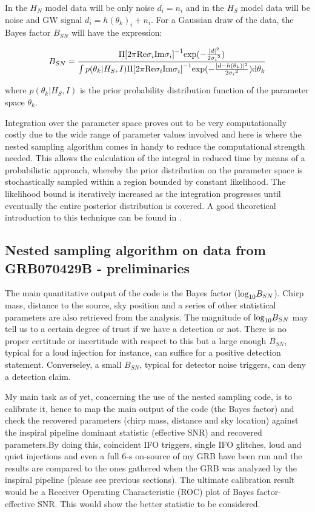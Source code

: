 \documentclass[epsf]{article}
\begin{document}
In the $H_N$ model data will be only noise $d_i=n_i$ and in the $H_S$ model data will be noise and GW signal $d_i=h(\theta_k)_i+n_i$. For a Gaussian draw of the data, the Bayes factor $B_{SN}$ will have the expression:

\begin{equation}
B_{SN} = \frac {\Pi {[2 \pi {\rm Re} \sigma_i {\rm Im} \sigma_i]}^{-1} {\rm exp}(-\frac{|d|^2}{2{\sigma_i}^2})}{\int p(\theta_k|H_S,I) \Pi {[2 \pi {\rm Re} \sigma_i {\rm Im} \sigma_i]}^{-1} {\rm exp}(-\frac {|d-h(\theta_k)|^2}{2{\sigma_i}^2}){\rm d} \theta_k}
\end{equation}

where $p(\theta_k|H_S,I)$ is the prior probability distribution function of the parameter space $\theta_k$. 

 Integration over the parameter space proves out to be very computationally costly \cite{veitch} due to the wide range of parameter values involved and here is where the nested sampling algorithm comes in handy to reduce the computational strength needed. This allows the calculation of the integral in reduced time by means of a probabilistic approach, whereby the prior distribution on the parameter space
is stochastically sampled within a region bounded by constant likelihood. The likelihood
bound is iteratively increased as the integration progresses until eventually the entire posterior
distribution is covered. A good theoretical introduction to this technique can be found in \cite{skilling}.

\subsection{Nested sampling algorithm on data from GRB070429B - preliminaries}

 The main quantitative output of the code is the Bayes factor (${\rm log}_{10}B_{SN}$). Chirp mass, distance to the source, sky position and a series of other statistical parameters are also retrieved from the analysis. The magnitude of ${\rm log}_{10}B_{SN}$ may tell us to a certain degree of trust if we have a detection or not. There is no proper certitude or incertitude with respect to this but a large enough  $B_{SN}$, typical for a loud injection for instance, can suffice for a positive detection statement. Converseley, a small $B_{SN}$, typical for detector noise triggers, can deny a detection claim.

 My main task as of yet, concerning the use of the nested sampling code, is to calibrate it, hence to map the main output of the code (the Bayes factor) and check the recovered parameters (chirp mass, distance and sky location) against the inspiral pipeline dominant statistic (effective SNR) and recovered parameters.By doing this, coincident IFO triggers, single IFO glitches, loud and quiet injections and even a full 6-s on-source of my GRB have been run and the results are compared to the ones gathered when the GRB was analyzed by the inspiral pipeline (please see previous sections). The ultimate calibration result would be a Receiver Operating Characteristic (ROC) plot of Bayes factor-effective SNR. This would show the better statistic to be considered. 
\end{document}
